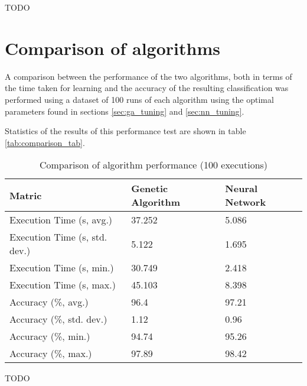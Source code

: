 \documentclass[a4paper]{article}
\begin{document}
TODO

\section{Comparison of algorithms}
\label{sec:comparison}

A comparison between the performance of the two algorithms, both in terms of the
time taken for learning and the accuracy of the resulting classification was
performed using a dataset of 100 runs of each algorithm using the optimal
parameters found in sections \ref{sec:ga_tuning} and \ref{sec:nn_tuning}.

Statistics of the results of this performance test are shown in table
\ref{tab:comparison_tab}.

\begin{table}[h!]
  \centering
  \begin{tabular}{@{}lll@{}}
    \toprule
    Matric                        & Genetic Algorithm & Neural Network \\
    \midrule
    Execution Time (s, avg.)      & 37.252            & 5.086          \\
    Execution Time (s, std. dev.) & 5.122             & 1.695          \\
    Execution Time (s, min.)      & 30.749            & 2.418          \\
    Execution Time (s, max.)      & 45.103            & 8.398          \\
    Accuracy (\%, avg.)           & 96.4              & 97.21          \\
    Accuracy (\%, std. dev.)      & 1.12              & 0.96           \\
    Accuracy (\%, min.)           & 94.74             & 95.26          \\
    Accuracy (\%, max.)           & 97.89             & 98.42          \\
    \bottomrule
  \end{tabular}
  \caption{Comparison of algorithm performance (100 executions)}
  \label{tab:comparison_avg}
\end{table}

TODO

\end{document}
